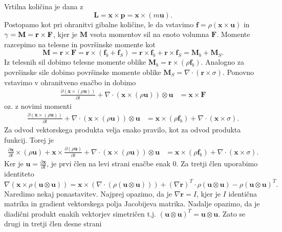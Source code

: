 \documentclass[mat2, tisk]{fmfdelo}
\newcommand{\bd}{\textbf}
\begin{document}
Vrtilna količina je dana z 
\begin{equation*}
\bd{L} = \bd{x} \times \bd{p} = \bd{x} \times (m\bd{u}).
\end{equation*}
Postopamo kot pri ohranitvi gibalne količine, le da vstavimo $\bd{f} = \rho (\bd{x} \times \bd{u})$ in $\bd{\text{$\gamma$}} = \bd{M} = \bd{r}\times \bd{F}$, kjer je $\bd{M}$ vsota momentov sil na enoto volumna $\bd{F}$. 
Momente razcepimo na telesne in površinske momente kot
$$
\bd{M} = \bd{r}\times \bd{F} = \bd{r}\times (\bd{f}_b + \bd{f}_S) = \bd{r}\times \bd{f}_b + \bd{r} \times \bd{f}_S = \bd{M}_b + \bd{M}_S.
$$
Iz telesnih sil dobimo telesne momente oblike $\bd{M}_b = \bd{r}\times (\rho\bd{f}_b)$. Analogno za površinske sile dobimo
površinske momente oblike $\bd{M}_S = \nabla \cdot (\bd{r} \times \sigma)$. Ponovno vstavimo v ohranitveno enačbo in dobimo
\begin{align*}
\frac{\partial (\bd{x} \times (\rho\bd{u}))}{\partial t} + \nabla \cdot (\bd{x} \times (\rho \bd{u})) \otimes \bd{u} &= \bd{x}\times \bd{F}
\end{align*}
oz. z novimi momenti 
\begin{align*}
  \frac{\partial (\bd{x} \times (\rho\bd{u}))}{\partial t} + \nabla \cdot (\bd{x} \times (\rho \bd{u})) \otimes \bd{u} &= \bd{x}\times (\rho \bd{f}_b) + \nabla \cdot (\bd{x} \times \sigma).
\end{align*}
Za odvod vektorskega produkta velja enako pravilo, kot za odvod produkta funkcij. Torej je
\begin{align*}
\frac{\partial \bd{x}}{\partial t} \times (\rho \bd{u}) + \bd{x} \times \frac{\partial (\rho\bd{u})}{\partial t} + \nabla \cdot (\bd{x} \times (\rho \bd{u})) \otimes \bd{u} &= \bd{x}\times (\rho \bd{f}_b) + \nabla \cdot (\bd{x} \times \sigma). 
\end{align*}
Ker je $\bd{u} = \frac{\partial \bd{x}}{\partial t}$, je prvi člen na levi strani enačbe enak 0.
Za tretji člen uporabimo identiteto
\begin{equation*}
\nabla(\bd{x} \times \rho(\bd{u}\otimes \bd{u})) = \bd{x}\times (\nabla\cdot (\rho(\bd{u}\otimes \bd{u}))) + (\nabla \bd{r})^T \cdot \rho(\bd{u}\otimes \bd{u}) - \rho (\bd{u}\otimes \bd{u})^T.
\end{equation*}
Naredimo nekaj ponastavitev. Najprej opazimo, da je $\nabla \bd{r} = I$, kjer je $I$ identična matrika in gradient 
vektorskega polja Jacobijeva matrika. Nadalje opazimo, da je diadični produkt 
enakih vektorjev simetričen t.j. $(\bd{u}\otimes \bd{u})^T = \bd{u}\otimes \bd{u}$. Zato se drugi in tretji člen desne strani
\end{document}
